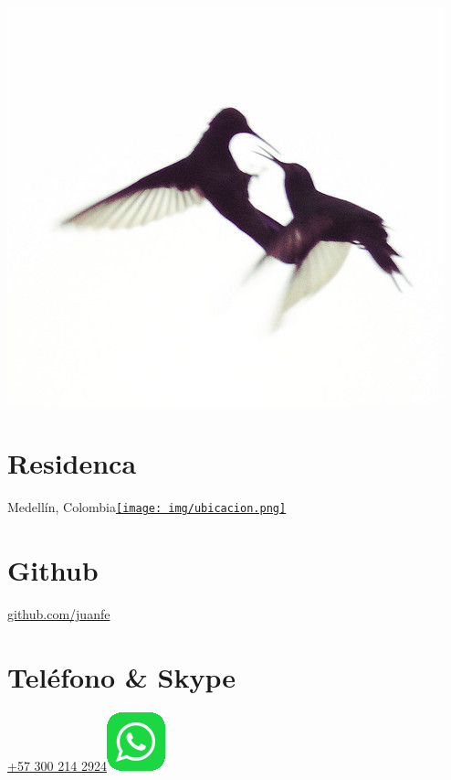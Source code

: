 \begin{aside}
    ~
    ~
    ~
    ~
    ~
    ~
  \includegraphics[scale=0.8]{img/coruscan.jpg}
    ~
  \section{Residenca}
	Medellín, Colombia\href{https://www.google.com/maps/place/Laureles+-+Estadio,+Medell%C3%ADn,+Laureles,+Medell%C3%ADn,+Antioquia/@6.2546395,-75.6144257,14}{\texttt{[image: img/ubicacion.png]}}
    ~
    ~
  \section{Github}
    \href{https://github.com/juanfe}{github.com/juanfe}
  \section{Teléfono \& Skype}
    \href{callto:+573002142924}{+57 300 214 2924\includegraphics[scale=0.15]{img/whatsapp.png}}
    ~
    ~

\end{aside}
